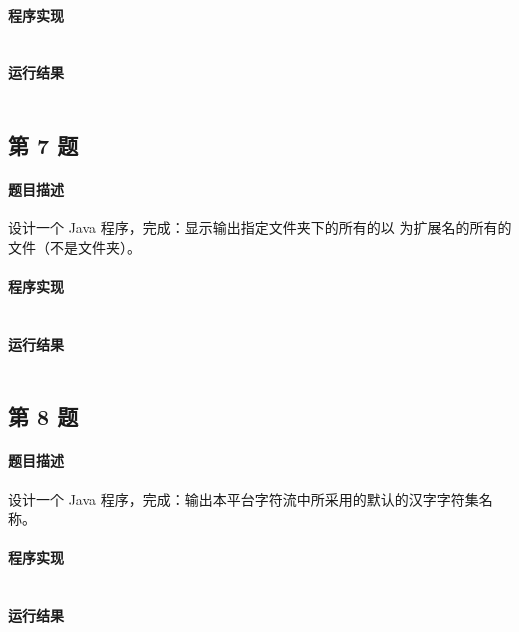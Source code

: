 \documentclass{academics}
\begin{document}
\paragraph{程序实现} {
    \inputminted[label=HiddenFiles.java]{java}{../src/P06/HiddenFiles.java}
}

\paragraph{运行结果} {
    \inputminted{text}{../res/P06.out}
}

\subsection{第 7 题}

\paragraph{题目描述} {
    设计一个 Java 程序，完成：显示输出指定文件夹下的所有的以  为扩展名的所有的文件（不是文件夹）。
}

\paragraph{程序实现} {
    \inputminted[label=DocFiles.java]{java}{../src/P07/DocFiles.java}
}

\paragraph{运行结果} {
    \inputminted{text}{../res/P07.out}
}

\subsection{第 8 题}

\paragraph{题目描述} {
    设计一个 Java 程序，完成：输出本平台字符流中所采用的默认的汉字字符集名称。
}

\paragraph{程序实现} {
    \inputminted[label=DefaultCharset.java]{java}{../src/P08/DefaultCharset.java}
}

\paragraph{运行结果} {
    \inputminted{text}{../res/P08.out}
}
\end{document}
